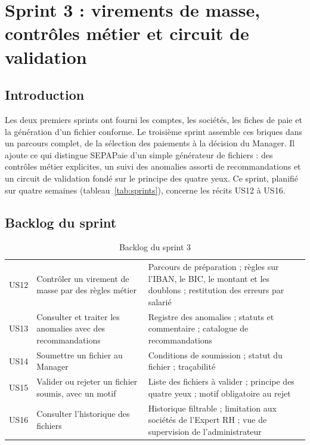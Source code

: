 \chapter{Sprint 3 : virements de masse, contrôles métier et circuit de validation}
\label{ch:sprint3}
\startcontents[chapters]
\chapterplan

\section{Introduction}

Les deux premiers sprints ont fourni les comptes, les sociétés, les fiches de paie et la génération d'un fichier conforme. Le troisième sprint assemble ces briques dans un parcours complet, de la sélection des paiements à la décision du Manager. Il ajoute ce qui distingue SEPAPaie d'un simple générateur de fichiers : des contrôles métier explicites, un suivi des anomalies assorti de recommandations et un circuit de validation fondé sur le principe des quatre yeux. Ce sprint, planifié sur quatre semaines (tableau~\ref{tab:sprints}), concerne les récits US12 à US16.

\section{Backlog du sprint}

\begin{table}[H]
\centering
\footnotesize
\renewcommand{\arraystretch}{1.1}
\tablestyle
\begin{tabularx}{\textwidth}{|>{\centering\arraybackslash}p{0.9cm}|>{\raggedright\arraybackslash}p{5.2cm}|Y|}
\hline
{} &  &  \\
\hline
US12 & Contrôler un virement de masse par des règles métier & Parcours de préparation ; règles sur l'IBAN, le BIC, le montant et les doublons ; restitution des erreurs par salarié \\
\hline
US13 & Consulter et traiter les anomalies avec des recommandations & Registre des anomalies ; statuts et commentaire ; catalogue de recommandations \\
\hline
US14 & Soumettre un fichier au Manager & Conditions de soumission ; statut du fichier ; traçabilité \\
\hline
US15 & Valider ou rejeter un fichier soumis, avec un motif & Liste des fichiers à valider ; principe des quatre yeux ; motif obligatoire au rejet \\
\hline
US16 & Consulter l'historique des fichiers & Historique filtrable ; limitation aux sociétés de l'Expert RH ; vue de supervision de l'administrateur \\
\hline
\end{tabularx}
\caption{Backlog du sprint 3}
\label{tab:backlog-s3}
\end{table}

